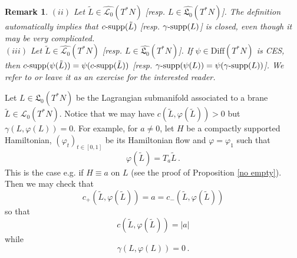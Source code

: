 \documentclass{article}
\newcommand{\1}{\mathbbm{1}}
\newtheorem{rem}[thm]{Remark}
\theoremstyle{remark}
\begin{document}
{{\begin{rem}
{$(ii)$ Let $\tilde{L} \in \widehat{\mathscr{L}_0}(T^*N)$ [resp. $L \in \widehat{\mathfrak{L}_0}(T^*N)$]. The definition automatically implies that $c\textnormal{-supp}(\tilde{L})$ [resp. $\gamma\textnormal{-supp}(L)$] is closed, even though it may be very complicated. \\
$(iii)$ Let $\tilde{L} \in \widehat{\mathscr{L}_0}(T^*N)$ [resp. $L \in \widehat{\mathfrak{L}_0}(T^*N)$]. If $\psi \in \mathrm{Diff}(T^*N)$ is CES, then $c\textnormal{-supp}(\psi(\tilde{L})) = \psi(c\textnormal{-supp}(\tilde{L}))$ [resp. $\gamma\textnormal{-supp}(\psi(L)) = \psi(\gamma\textnormal{-supp}(L))$]. We refer to \cite[Corollary 6.22.]{vit22} or leave it as an exercise for the interested reader}.
\end{rem}
\indent Let $L \in \mathfrak{L}_0(T^*N)$ be the Lagrangian submanifold associated to a brane $\tilde{L} \in \mathscr{L}_0(T^*N)$. Notice that we may have $c(\tilde{L},\varphi(\tilde{L})) > 0$ but $\gamma(L,\varphi(L)) = 0$. For example, for $a \ne 0$, let $H$ be a compactly supported Hamiltonian, $(\varphi_t)_{t \in [0,1]}$ be its Hamiltonian flow and $\varphi = \varphi_1$ such that
$$\varphi(\tilde{L}) = T_a\tilde{L}\, .$$
This is the case e.g. if $H\equiv a$ on $L$ (see the proof of Proposition \ref{no empty}).  Then we may check that
$$c_+(\tilde{L}, \varphi(\tilde{L})) = a = c_-(\tilde{L}, \varphi(\tilde{L}))$$
so that
$$c(\tilde{L},\varphi(\tilde{L})) = |a|  $$ while $$ \gamma(L, \varphi(L)) = 0\, .$$

}}
\end{document}
